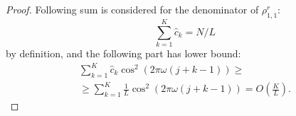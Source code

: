\documentclass[sii]{ipart}
\begin{document}
\begin{proof}
	Following sum is considered for the denominator of $\rho^r_{1,1}$:
	\begin{equation*}
	\sum_{k=1}^K \hat c_k = N / L
	\end{equation*}
	by definition, and the following part has lower bound:
	\begin{multline*}
	\sum_{k=1}^K \hat c_k\cos^2(2 \pi \omega (j + k - 1)) \ge \\ \ge \sum_{k=1}^K \frac{1}{L}\cos^2(2 \pi \omega (j + k - 1)) = O \left(\frac{K}{L} \right).
	\end{multline*}
\end{proof}




\end{document}
